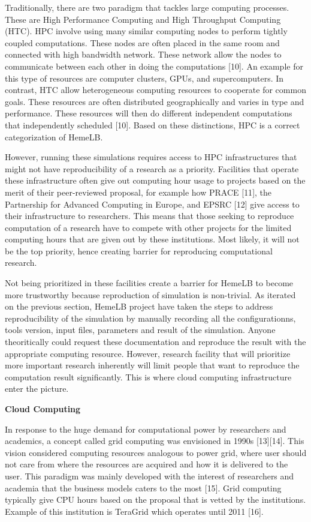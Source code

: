 \documentclass[]{article}
\begin{document}
Traditionally, there are two paradigm that tackles large computing
processes. These are High Performance Computing and High Throughput
Computing (HTC). HPC involve using many similar computing nodes to
perform tightly coupled computations. These nodes are often placed in
the same room and connected with high bandwidth network. These network
allow the nodes to communicate between each other in doing the
computations {[}10{]}. An example for this type of resources are
computer clusters, GPUs, and supercomputers. In contrast, HTC allow
heterogeneous computing resources to cooperate for common goals. These
resources are often distributed geographically and varies in type and
performance. These resources will then do different independent
computations that independently scheduled {[}10{]}. Based on these
distinctions, HPC is a correct categorization of HemeLB.

However, running these simulations requires access to HPC
infrastructures that might not have reproducibility of a research as a
priority. Facilities that operate these infrastructure often give out
computing hour usage to projects based on the merit of their
peer-reviewed proposal, for example how PRACE {[}11{]}, the Partnership
for Advanced Computing in Europe, and EPSRC {[}12{]} give access to
their infrastructure to researchers. This means that those seeking to
reproduce computation of a research have to compete with other projects
for the limited computing hours that are given out by these
institutions. Most likely, it will not be the top priority, hence
creating barrier for reproducing computational research.

Not being prioritized in these facilities create a barrier for HemeLB to
become more trustworthy because reproduction of simulation is
non-trivial. As iterated on the previous section, HemeLB project have
taken the steps to address reproducibility of the simulation by manually
recording all the configurationns, tools version, input files,
parameters and result of the simulation. Anyone theoritically could
request these documentation and reproduce the result with the
appropriate computing resource. However, research facility that will
prioritize more important research inherently will limit people that
want to reproduce the computation result significantly. This is where
cloud computing infrastructure enter the picture.

\textbf{Cloud Computing}

In response to the huge demand for computational power by researchers
and academics, a concept called grid computing was envisioned in 1990s
{[}13{]}{[}14{]}. This vision considered computing resources analogous
to power grid, where user should not care from where the resources are
acquired and how it is delivered to the user. This paradigm was mainly
developed with the interest of researchers and academia that the
business models caters to the most {[}15{]}. Grid computing typically
give CPU hours based on the proposal that is vetted by the institutions.
Example of this institution is TeraGrid which operates until 2011
{[}16{]}.
\end{document}
